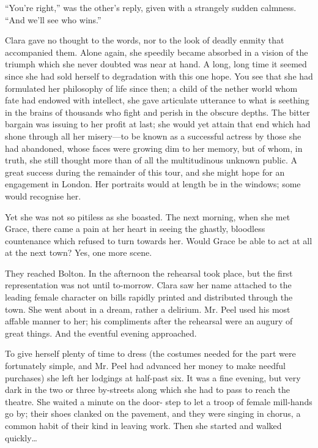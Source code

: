 ``You're right,'' was the other's reply, given with a strangely sudden
calmness. ``And we'll see who wins.''

Clara gave no thought to the words, nor to the look of deadly enmity
that accompanied them. Alone again, she speedily became absorbed in a
vision of the triumph which she never doubted was near at hand. A long,
long time it seemed since she had sold herself to degradation with this
one hope. You see that she had formulated her philosophy of life since
then; a child of the nether world whom fate had endowed with intellect,
she gave articulate utterance to what is seething in the brains of
thousands who fight and perish in the obscure depths. The bitter bargain
was issuing to her profit at last; she would yet attain that end which
had shone through all her misery---to be known as a successful actress
by those she had abandoned, whose faces were growing dim to her memory,
but of whom, in truth, she still {}thought more than of all the
multitudinous unknown public. A great success during the remainder of
this tour, and she might hope for an engagement in London. Her portraits
would at length be in the windows; some would recognise her.

Yet she was not so pitiless as she boasted. The next morning, when she
met Grace, there came a pain at her heart in seeing the ghastly,
bloodless countenance which refused to turn towards her. Would Grace be
able to act at all at the next town? Yes, one more scene.

They reached Bolton. In the afternoon the rehearsal took place, but the
first representation was not until to-morrow. Clara saw her name
attached to the leading female character on bills rapidly printed and
distributed through the town. She went about in a dream, rather a
delirium. Mr. Peel used his most affable manner to her; his compliments
after the rehearsal were an augury of great things. And the eventful
evening approached.

{}To give herself plenty of time to dress (the costumes needed for the
part were fortunately simple, and Mr. Peel had advanced her money to
make needful purchases) she left her lodgings at half-past six. It was a
fine evening, but very dark in the two or three by-streets along which
she had to pass to reach the theatre. She waited a minute on the door-
step to let a troop of female mill-hands go by; their shoes clanked on
the pavement, and they were singing in chorus, a common habit of their
kind in leaving work. Then she started and walked quickly\ldots{}

